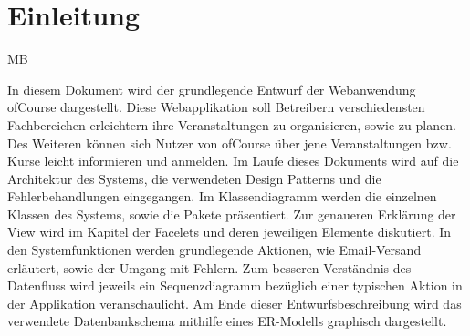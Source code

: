 \chapter{Einleitung}
\begin{tiny}
MB \\
\end{tiny}
In diesem Dokument wird der grundlegende Entwurf der Webanwendung \glqq ofCourse\grqq{} dargestellt. Diese Webapplikation soll Betreibern verschiedensten Fachbereichen erleichtern ihre Veranstaltungen zu organisieren, sowie zu planen. Des Weiteren können sich Nutzer von \glqq ofCourse\grqq{} über jene Veranstaltungen bzw. Kurse leicht informieren und anmelden. Im Laufe dieses Dokuments wird auf die Architektur des Systems, die verwendeten Design Patterns und die Fehlerbehandlungen eingegangen. Im Klassendiagramm werden die einzelnen Klassen des Systems, sowie die Pakete präsentiert. Zur genaueren Erklärung der View wird im Kapitel der Facelets und deren jeweiligen Elemente diskutiert. In den Systemfunktionen werden grundlegende Aktionen, wie Email-Versand erläutert, sowie der Umgang mit Fehlern. Zum besseren Verständnis des Datenfluss wird jeweils ein Sequenzdiagramm bezüglich einer typischen Aktion in der Applikation veranschaulicht. 
Am Ende dieser Entwurfsbeschreibung wird das verwendete Datenbankschema mithilfe eines ER-Modells graphisch dargestellt.
